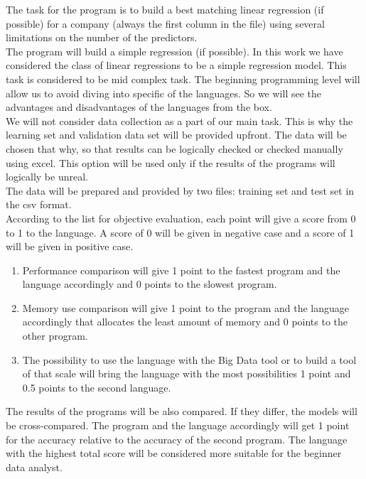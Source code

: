 \documentclass [twoside,
  11pt, a4paper,
  footinclude=true,
  headinclude=true,
  cleardoublepage=empty
]{article}
\begin{document}
The task for the program is to build a best matching linear regression (if possible) for a company (always the first column in the file) using several limitations on the number of the predictors.\\
The program will build a simple regression (if possible). In this work we have considered the class of linear regressions to be a simple regression model. This task is considered to be mid complex task. The beginning programming level will allow us to avoid diving into specific of the languages. So we will see the advantages and disadvantages of the languages from the box.\\
We will not consider data collection as a part of our main task. This is why the learning set and validation data set will be provided upfront. The data will be chosen that why, so that results can be logically checked or checked manually using excel. This option will be used only if the results of the programs will logically be unreal.\\
The data will be prepared and provided by two files: training set and test set in the csv format.\\
According to the list for objective evaluation, each point will give a score from 0 to 1 to the language. A score of 0 will be given in negative case and a score of 1 will be given in positive case.
\begin{enumerate}
    \item Performance comparison will give 1 point to the fastest program and the language accordingly and 0 points to the slowest program.
    \item Memory use comparison will give 1 point to the program and the language accordingly that allocates the least amount of memory and 0 points to the other program.
    \item The possibility to use the language with the Big Data tool or to build a tool of that scale will bring the language with the most possibilities 1 point and 0.5 points to the second language.
\end{enumerate}
The results of the programs will be also compared. If they differ, the models will be cross-compared. The program and the language accordingly will get 1 point for the accuracy relative to the accuracy of the second program. The language with the highest total score will be considered more suitable for the beginner data analyst.\\
\end{document}
